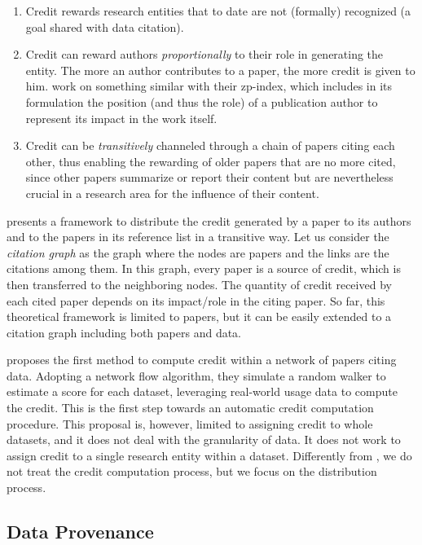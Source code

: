 \begin{enumerate}
\item Credit rewards research entities that to date are not (formally) recognized (a goal shared with data citation).
\item Credit can reward authors \emph{proportionally} to their role in generating the entity. The more an author contributes to a paper, the more credit is given to him. \citet{ZouP16} work on something similar with their zp-index, which includes in its formulation the position (and thus the role) of a publication author to represent its impact in the work itself.
\item Credit can be \emph{transitively} channeled through a chain of papers citing each other, thus enabling the rewarding of older papers that are no more cited, since other papers summarize or report their content 
but are nevertheless crucial in a research area for the influence of their content.
\end{enumerate}

\citet{creditFang18} presents a framework to distribute the credit generated by a paper to its authors and to the papers in its reference list in a transitive way. 
Let us consider the \emph{citation graph} as the graph where the nodes are papers and the links are the citations among them.
In this graph, every paper is a source of credit, which is then transferred to the neighboring nodes.
The quantity of credit received by each cited paper depends on its impact/role in the citing paper. 
So far, this theoretical framework is limited to papers, but it can be easily extended to a citation graph including both papers and data. 

\citet{zeng2020assigning} proposes the first method to compute credit within a network of papers citing data. 
Adopting a network flow algorithm, they simulate a random walker to estimate a score for each dataset, leveraging real-world usage data to compute the credit.
This is the first step towards an automatic credit computation procedure.
This proposal is, however, limited to assigning credit to whole datasets, and it does not deal with the granularity of data. It does not work to assign credit to a single research entity within a dataset. 
Differently from \citet{zeng2020assigning}, we do not treat the credit computation process, but we focus on the distribution process.

\subsection{Data Provenance}
\label{section:related_provenance}

